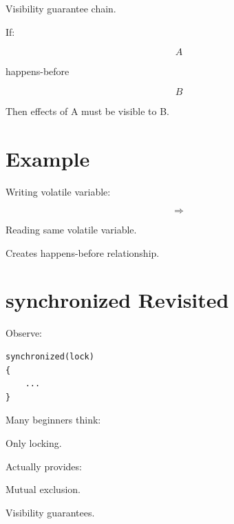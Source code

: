 \documentclass[11pt,a4paper]{book}
\begin{document}
Visibility guarantee chain.


If:

\[
A
\]

happens-before

\[
B
\]


Then effects of A
must be visible to B.


\section{Example}

Writing volatile variable:

\[
\Rightarrow
\]

Reading same volatile variable.


Creates happens-before relationship.


\section{synchronized Revisited}

Observe:

\begin{verbatim} 
synchronized(lock)
{
    ...
}
\end{verbatim}


Many beginners think:


Only locking.


Actually provides:


Mutual exclusion.


Visibility guarantees.
\end{document}
